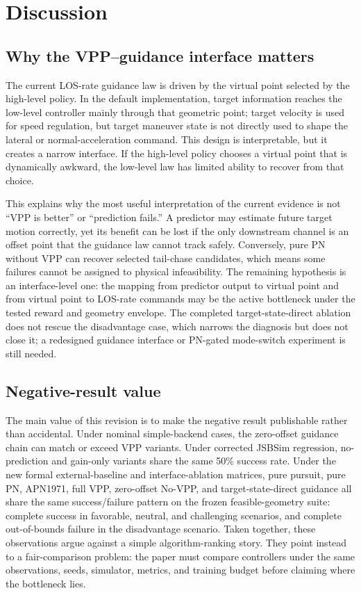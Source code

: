 \section{Discussion}\label{sec:discussion}

\subsection{Why the VPP--guidance interface matters}

The current LOS-rate guidance law is driven by the virtual point selected by the high-level policy. In the default implementation, target information reaches the low-level controller mainly through that geometric point; target velocity is used for speed regulation, but target maneuver state is not directly used to shape the lateral or normal-acceleration command. This design is interpretable, but it creates a narrow interface. If the high-level policy chooses a virtual point that is dynamically awkward, the low-level law has limited ability to recover from that choice.

This explains why the most useful interpretation of the current evidence is not ``VPP is better'' or ``prediction fails.'' A predictor may estimate future target motion correctly, yet its benefit can be lost if the only downstream channel is an offset point that the guidance law cannot track safely. Conversely, pure PN without VPP can recover selected tail-chase candidates, which means some failures cannot be assigned to physical infeasibility. The remaining hypothesis is an interface-level one: the mapping from predictor output to virtual point and from virtual point to LOS-rate commands may be the active bottleneck under the tested reward and geometry envelope. The completed target-state-direct ablation does not rescue the disadvantage case, which narrows the diagnosis but does not close it; a redesigned guidance interface or PN-gated mode-switch experiment is still needed.

\subsection{Negative-result value}

The main value of this revision is to make the negative result publishable rather than accidental. Under nominal simple-backend cases, the zero-offset guidance chain can match or exceed VPP variants. Under corrected JSBSim regression, no-prediction and gain-only variants share the same 50\% success rate. Under the new formal external-baseline and interface-ablation matrices, pure pursuit, pure PN, APN1971, full VPP, zero-offset No-VPP, and target-state-direct guidance all share the same success/failure pattern on the frozen feasible-geometry suite: complete success in favorable, neutral, and challenging scenarios, and complete out-of-bounds failure in the disadvantage scenario. Taken together, these observations argue against a simple algorithm-ranking story. They point instead to a fair-comparison problem: the paper must compare controllers under the same observations, seeds, simulator, metrics, and training budget before claiming where the bottleneck lies.

